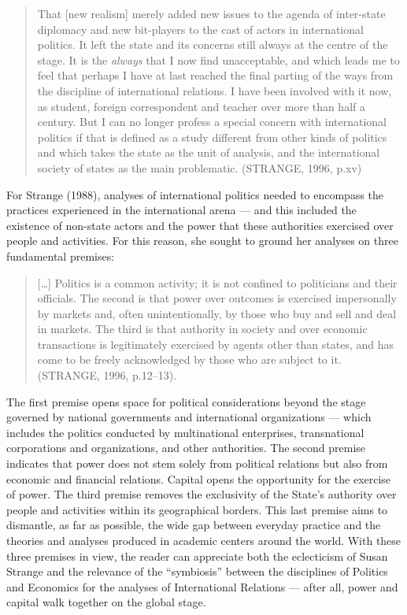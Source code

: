 \begin{quote}
That [new realism] merely added new issues to the agenda of inter-state diplomacy and new bit-players to the cast of actors in international politics. It left the state and its concerns still always at the centre of the stage. It is the \textit{always} that I now find unacceptable, and which leads me to feel that perhaps I have at last reached the final parting of the ways from the discipline of international relations. I have been involved with it now, as student, foreign correspondent and teacher over more than half a century. But I can no longer profess a special concern with international politics if that is defined as a study different from other kinds of politics and which takes the state as the unit of analysis, and the international society of states as the main problematic. (STRANGE, 1996, p.xv)
\end{quote}

For Strange (1988), analyses of international politics needed to encompass the practices experienced in the international arena --- and this included the existence of non-state actors and the power that these authorities exercised over people and activities. For this reason, she sought to ground her analyses on three fundamental premises:

\begin{quote}
{[}\ldots{]} Politics is a common activity; it is not confined to politicians and their officials. The second is that power over outcomes is exercised impersonally by markets and, often unintentionally, by those who buy and sell and deal in markets. The third is that authority in society and over economic transactions is legitimately exercised by agents other than states, and has come to be freely acknowledged by those who are subject to it. (STRANGE, 1996, p.12--13).
\end{quote}

The first premise opens space for political considerations beyond the stage governed by national governments and international organizations --- which includes the politics conducted by multinational enterprises, transnational corporations and organizations, and other authorities. The second premise indicates that power does not stem solely from political relations but also from economic and financial relations. Capital opens the opportunity for the exercise of power. The third premise removes the exclusivity of the State's authority over people and activities within its geographical borders. This last premise aims to dismantle, as far as possible, the wide gap between everyday practice and the theories and analyses produced in academic centers around the world. With these three premises in view, the reader can appreciate both the eclecticism of Susan Strange and the relevance of the ``symbiosis'' between the disciplines of Politics and Economics for the analyses of International Relations --- after all, power and capital walk together on the global stage.

